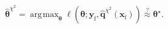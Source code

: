 \documentclass[english,xcolor={rgb,dvipsnames,table,usenames}, presentation]{beamer}
\DeclareMathOperator*{\argmax}{\arg\!\max}
\newcommand\q{{\bm{q}}}
\begin{document}
\begin{frame}
\begin{minipage}[c]{0.15\linewidth}
\begin{animateinline}[poster=first,loop]{2}%
{\color{orange}{\bf CACF}}%
\newframe \end{animateinline}
\end{minipage}
\begin{minipage}[c]{0.8\linewidth}
\[ \hat{\bm{\theta}}^{\chi^2} = \argmax_{\bm{\theta}} \ell(\bm{\theta} ; \mathbf{y}_\text{f}, {\hat{\q}^{\chi^2}}(\mathbf{x}_\text{f})) \stackrel{?}{\approx} \bm{\theta}^\star. \]
\end{minipage}
\vspace*{0.1cm}

\end{frame}
\end{document}
